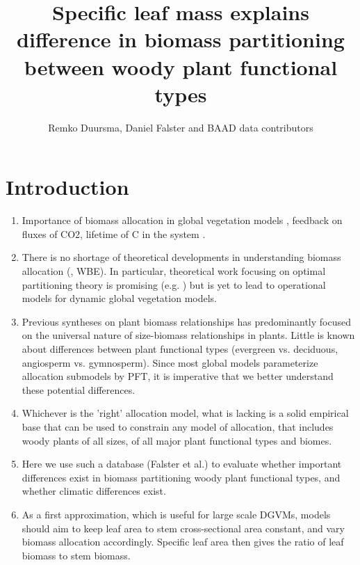 \documentclass[a4paper]{article}
\begin{document}
\title{Specific leaf mass explains difference in biomass partitioning between woody plant functional types}

\author{Remko Duursma, Daniel Falster and BAAD data contributors}

\maketitle



\section{Introduction}

\begin{enumerate}
\item Importance of biomass allocation in global vegetation models \cite{ise_comparison_2010}, feedback on fluxes of CO2, lifetime of C in the system \cite{friend_carbon_2014}.
  
\item There is no shortage of theoretical developments in understanding biomass allocation (\cite{cannell_carbon_1994,franklin_modeling_2012}, WBE). In particular, theoretical work focusing on optimal partitioning theory is promising (e.g. \cite{valentine_modeling_2012}) but is yet to lead to operational models for dynamic global vegetation models.
  
\item Previous syntheses on plant biomass relationships has predominantly focused on the universal nature of size-biomass relationships in plants. Little is known about differences between plant functional types (evergreen vs. deciduous, angiosperm vs. gymnosperm). Since most global models parameterize allocation submodels by PFT, it is imperative that we better understand these potential differences.
  
\item Whichever is the 'right' allocation model, what is lacking is a solid empirical base that can be used to constrain any model of allocation, that includes woody plants of all sizes, of all major plant functional types and biomes.
  
\item Here we use such a database (Falster et al.) to evaluate whether important differences exist in biomass partitioning woody plant functional types, and whether climatic differences exist.
  
\item As a first approximation, which is useful for large scale DGVMs, models should aim to keep leaf area to stem cross-sectional area constant, and vary biomass allocation accordingly. Specific leaf area then gives the ratio of leaf biomass to stem biomass. 

\end{enumerate}
\end{document}
